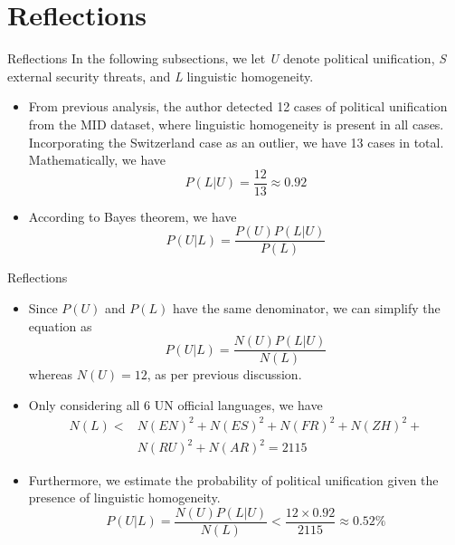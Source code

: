 \documentclass{beamer}
\begin{document}
	\section{Reflections}
	\begin{frame}{Reflections}
		In the following subsections, we let \textit{U} denote political unification, \textit{S} external security threats, and \textit{L} linguistic homogeneity.
		\begin{itemize}
			\item From previous analysis, the author detected 12 cases of political unification from the MID dataset, where linguistic homogeneity is present in all cases. Incorporating the Switzerland case as an outlier, we have 13 cases in total. Mathematically, we have
			\begin{equation}
				P(L|U)=\frac{12}{13} \approx 0.92
			\end{equation}
			\item According to Bayes theorem, we have 
			\begin{equation}
				P(U|L)=\frac{P(U)P(L|U)}{P(L)}
			\end{equation}
		\end{itemize}
	\end{frame}
	\begin{frame}{Reflections}
		\begin{itemize}
			\item Since $P(U)$ and $P(L)$ have the same denominator, we can simplify the equation as
			\begin{equation}
				P(U|L)=\frac{N(U)P(L|U)}{N(L)}
			\end{equation}
			whereas $N(U)=12$, as per previous discussion.
			\item Only considering all 6 UN official languages, we have
			\begin{equation}
				\begin{aligned}
					N(L)< & N(EN)^2 + N(ES)^2 + N(FR)^2 + N(ZH)^2 + \\
					& N(RU)^2 + N(AR)^2 = 2115
				\end{aligned}
			\end{equation}
			\item Furthermore, we estimate the probability of political unification given the presence of linguistic homogeneity.
			\begin{equation}
				P(U|L)=\frac{N(U)P(L|U)}{N(L)}<\frac{12\times 0.92}{2115}\approx 0.52\%
			\end{equation}
		\end{itemize}
	\end{frame}
\end{document}
